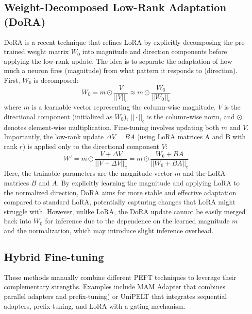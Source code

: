 \subsection{Weight-Decomposed Low-Rank Adaptation (DoRA)}\label{dora_theory}
DoRA \cite{liu2024dora} is a recent technique that refines LoRA by explicitly decomposing the pre-trained weight matrix \( W_0 \) into magnitude and direction components before applying the low-rank update. The idea is to separate the adaptation of how much a neuron fires (magnitude) from what pattern it responds to (direction).
First, \( W_0 \) is decomposed:
\begin{equation}
    W_0 = m \odot \frac{V}{||V||_c} \approx m \odot \frac{W_0}{||W_0||_c}
    \label{eq:dora_decomposition_peft_2}
\end{equation}
where \( m \) is a learnable vector representing the column-wise magnitude, \( V \) is the directional component (initialized as \( W_0 \)), \( ||\cdot||_c \) is the column-wise norm, and \(\odot\) denotes element-wise multiplication.
Fine-tuning involves updating both \( m \) and \( V \). Importantly, the low-rank update \( \Delta V = BA \) (using LoRA matrices A and B with rank \( r \)) is applied only to the directional component \( V \):
\begin{equation}
    W' = m \odot \frac{V + \Delta V}{||V + \Delta V||_c} = m \odot \frac{W_0 + BA}{||W_0 + BA||_c}
    \label{eq:dora_finetune_peft_2}
\end{equation}
Here, the trainable parameters are the magnitude vector \( m \) and the LoRA matrices \( B \) and \( A \). By explicitly learning the magnitude and applying LoRA to the normalized direction, DoRA aims for more stable and effective adaptation compared to standard LoRA, potentially capturing changes that LoRA might struggle with. However, unlike LoRA, the DoRA update cannot be easily merged back into \( W_0 \) for inference due to the dependence on the learned magnitude \( m \) and the normalization, which may introduce slight inference overhead.

\subsection{Hybrid Fine-tuning}
These methods manually combine different PEFT techniques to leverage their complementary strengths. Examples include MAM Adapter \cite{he2021unified} that combines parallel adapters and prefix-tuning) or UniPELT \cite{mao2021unipelt} that integrates sequential adapters, prefix-tuning, and LoRA with a gating mechanism.

